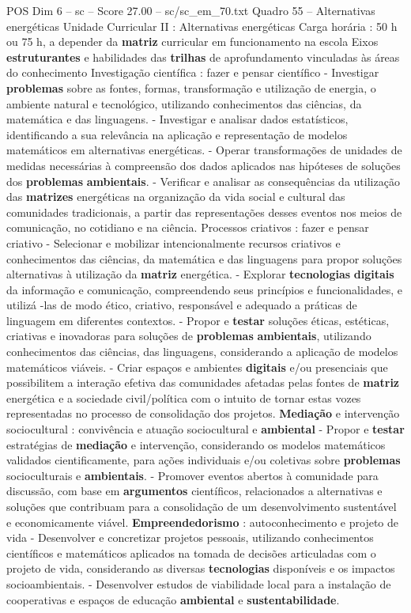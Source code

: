 \begin{textsample}{POS Dim 6 – sc – Score 27.00 – sc/sc\_em\_70.txt}
Quadro 55 – Alternativas energéticas Unidade Curricular II : Alternativas energéticas Carga horária : 50 h ou 75 h, a depender da \textbf{matriz} curricular em funcionamento na escola Eixos \textbf{estruturantes} e habilidades das \textbf{trilhas} de aprofundamento vinculadas às áreas do conhecimento Investigação científica : fazer e pensar científico - Investigar \textbf{problemas} sobre as fontes, formas, transformação e utilização de energia, o ambiente natural e tecnológico, utilizando conhecimentos das ciências, da matemática e das linguagens. - Investigar e analisar dados estatísticos, identificando a sua relevância na aplicação e representação de modelos matemáticos em alternativas energéticas. - Operar transformações de unidades de medidas necessárias à compreensão dos dados aplicados nas hipóteses de soluções dos \textbf{problemas} \textbf{ambientais}. - Verificar e analisar as consequências da utilização das \textbf{matrizes} energéticas na organização da vida social e cultural das comunidades tradicionais, a partir das representações desses eventos nos meios de comunicação, no cotidiano e na ciência.
Processos criativos : fazer e pensar criativo - Selecionar e mobilizar intencionalmente recursos criativos e conhecimentos das ciências, da matemática e das linguagens para propor soluções alternativas à utilização da \textbf{matriz} energética. - Explorar \textbf{tecnologias} \textbf{digitais} da informação e comunicação, compreendendo seus princípios e funcionalidades, e utilizá -las de modo ético, criativo, responsável e adequado a práticas de linguagem em diferentes contextos. - Propor e \textbf{testar} soluções éticas, estéticas, criativas e inovadoras para soluções de \textbf{problemas} \textbf{ambientais}, utilizando conhecimentos das ciências, das linguagens, considerando a aplicação de modelos matemáticos viáveis. - Criar espaços e ambientes \textbf{digitais} e/ou presenciais que possibilitem a interação efetiva das comunidades afetadas pelas fontes de \textbf{matriz} energética e a sociedade civil/política com o intuito de tornar estas vozes representadas no processo de consolidação dos projetos. \textbf{Mediação} e intervenção sociocultural : convivência e atuação sociocultural e \textbf{ambiental} - Propor e \textbf{testar} estratégias de \textbf{mediação} e intervenção, considerando os modelos matemáticos validados cientificamente, para ações individuais e/ou coletivas sobre \textbf{problemas} socioculturais e \textbf{ambientais}. - Promover eventos abertos à comunidade para discussão, com base em \textbf{argumentos} científicos, relacionados a alternativas e soluções que contribuam para a consolidação de um desenvolvimento sustentável e economicamente viável. \textbf{Empreendedorismo} : autoconhecimento e projeto de vida - Desenvolver e concretizar projetos pessoais, utilizando conhecimentos científicos e matemáticos aplicados na tomada de decisões articuladas com o projeto de vida, considerando as diversas \textbf{tecnologias} disponíveis e os impactos socioambientais. - Desenvolver estudos de viabilidade local para a instalação de cooperativas e espaços de educação \textbf{ambiental} e \textbf{sustentabilidade}.

\end{textsample}
